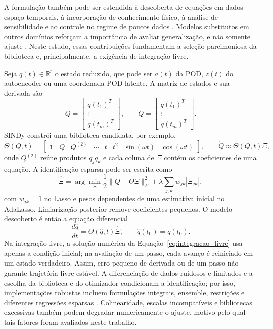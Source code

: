 \documentclass[12pt,a4paper]{article}
\begin{document}
A formulação também pode ser estendida à descoberta de equações em dados espaço-temporais, à incorporação de conhecimento físico, à análise de sensibilidade e ao controle no regime de poucos dados \cite{rudy2017,corbetta2020,naozuka2022,kaiser2018}. Modelos substitutos em outros domínios reforçam a importância de avaliar generalização, e não somente ajuste \cite{dixit2025}. Neste estudo, essas contribuições fundamentam a seleção parcimoniosa da biblioteca e, principalmente, a exigência de integração livre.

Seja $q(t)\in\mathbb{R}^{r}$ o estado reduzido, que pode ser $a(t)$ da POD, $z(t)$ do autoencoder ou uma coordenada POD latente. A matriz de estados e sua derivada são
\begin{equation}
Q=\begin{bmatrix}q(t_1)^T\\ \vdots\\q(t_m)^T\end{bmatrix},
\qquad
\dot Q=\begin{bmatrix}\dot q(t_1)^T\\ \vdots\\\dot q(t_m)^T\end{bmatrix}.
\end{equation}
SINDy constrói uma biblioteca candidata, por exemplo,
\begin{equation}
\Theta(Q,t)=
\begin{bmatrix}
\mathbf{1}&Q&Q^{(2)}&\cdots&t&t^2&\sin(\omega t)&\cos(\omega t)
\end{bmatrix},
\qquad
\dot Q\approx\Theta(Q,t)\Xi,
\label{eq:sindy}
\end{equation}
onde $Q^{(2)}$ reúne produtos $q_jq_k$ e cada coluna de $\Xi$ contém os coeficientes de uma equação. A identificação esparsa pode ser escrita como
\begin{equation}
\widehat\Xi=
\arg\min_{\Xi}
\frac12\lVert\dot Q-\Theta\Xi\rVert_F^2
+\lambda\sum_{j,k}w_{jk}|\Xi_{jk}|,
\label{eq:alasso}
\end{equation}
com $w_{jk}=1$ no Lasso e pesos dependentes de uma estimativa inicial no AdaLasso. Limiarização posterior remove coeficientes pequenos. O modelo descoberto é então a equação diferencial
\begin{equation}
\frac{d\widehat q}{dt}=\Theta(\widehat q,t)\widehat\Xi,
\qquad
\widehat q(t_0)=q(t_0).
\label{eq:integracao_livre}
\end{equation}
Na integração livre, a solução numérica da Equação~\eqref{eq:integracao_livre} usa apenas a condição inicial; na avaliação de um passo, cada avanço é reiniciado em um estado verdadeiro. Assim, erro pequeno de derivada ou de um passo não garante trajetória livre estável. A diferenciação de dados ruidosos e limitados e a escolha da biblioteca e do otimizador condicionam a identificação; por isso, implementações robustas incluem formulações integrais, ensemble, restrições e diferentes regressões esparsas \cite{kaptanoglu2022}. Colinearidade, escalas incompatíveis e bibliotecas excessivas também podem degradar numericamente o ajuste, motivo pelo qual tais fatores foram avaliados neste trabalho.
\end{document}
